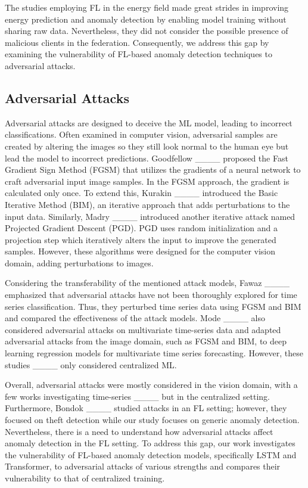 The studies employing FL in the energy field made great strides in improving energy prediction and anomaly detection by enabling model training without sharing raw data. Nevertheless, they did not consider the possible presence of malicious clients in the federation. Consequently, we address this gap by examining the vulnerability of FL-based anomaly detection techniques to adversarial attacks.

\subsection{Adversarial Attacks}
\label{sub_sec:AdversarialAttack}

Adversarial attacks are designed to deceive the ML model, leading to incorrect classifications. Often examined in computer vision, adversarial samples are created by altering the images so they still look normal to the human eye but lead the model to incorrect predictions. Goodfellow \etal ____ proposed the Fast Gradient Sign Method (FGSM) that utilizes the gradients of a neural network to craft adversarial input image samples. In the FGSM approach, the gradient is calculated only once. To extend this, Kurakin \etal ____ introduced the Basic Iterative Method (BIM), an iterative approach that adds perturbations to the input data. Similarly, Madry \etal ____ introduced another iterative attack named Projected Gradient Descent (PGD). PGD uses random initialization and a projection step which iteratively alters the input to improve the generated samples. However, these algorithms were designed for the computer vision domain, adding perturbations to images.

Considering the transferability of the mentioned attack models, Fawaz \etal ____ emphasized that adversarial attacks have not been thoroughly explored for time series classification. Thus, they perturbed time series data using FGSM and BIM and compared the effectiveness of the attack models. Mode \etal ____ also considered adversarial attacks on multivariate time-series data and adapted adversarial attacks from the image domain, such as FGSM and BIM, to deep learning regression models for multivariate time series forecasting. However, these studies  ____ only considered centralized ML.  

Overall, adversarial attacks were mostly considered in the vision domain, with a few works investigating time-series ____ but in the centralized setting. Furthermore, Bondok \etal ____ studied attacks in an FL setting; however, they focused on theft detection while our study focuses on generic anomaly detection. Nevertheless, there is a need to understand how adversarial attacks affect anomaly detection in the FL setting. To address this gap, our work investigates the vulnerability of FL-based anomaly detection models, specifically LSTM and Transformer, to adversarial attacks of various strengths and compares their vulnerability to that of centralized training.


